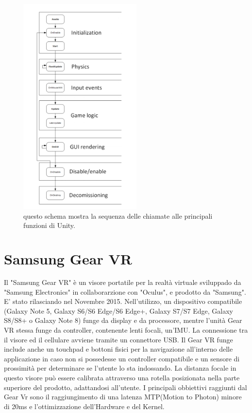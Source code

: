 \begin{figure}[H]
	\includegraphics[width=0.55\textwidth]{figure/FunctionsScheme}
	\centering
	\caption{questo schema mostra la sequenza delle chiamate alle principali funzioni di Unity.}
\end{figure}


\section{Samsung Gear VR}

Il "Samsung Gear VR" è un visore portatile  per la realtà virtuale sviluppado da "Samsung Electronics" in collaborarzione con "Oculus", e prodotto da "Samsung". E' stato rilasciando nel Novembre 2015. Nell'utilizzo, un dispositivo compatibile (Galaxy Note 5, Galaxy S6/S6 Edge/S6 Edge+, Galaxy S7/S7 Edge, Galaxy S8/S8+ o Galaxy Note 8) funge da display e da processore, mentre l'unità Gear VR stessa funge da controller, contenente lenti focali, un'IMU. La connessione tra il visore ed il cellulare avviene tramite un connettore USB. Il Gear VR funge include anche un touchpad e bottoni fisici per la navigazione all'interno delle applicazione in caso non si possedesse un controller compatibile e un sensore di prossimità per determinare se l'utente lo sta indossando. La distanza focale in questo visore può essere calibrata attraverso una rotella posizionata nella parte superiore del prodotto, adattandosi all'utente. I principali obbiettivi raggiunti dal Gear Vr sono il raggiungimento di una latenza MTP(Motion to Photon) minore di 20ms e l'ottimizzazione dell'Hardware e del Kernel. \\

